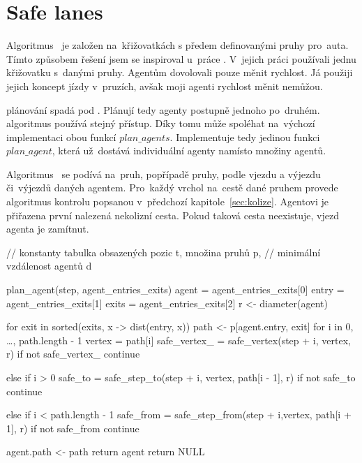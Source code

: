 \section{Safe lanes}\label{sec:safe_lanes}



Algoritmus~ je založen na~křižovatkách s předem definovanými pruhy pro~auta.
Tímto způsobem řešení jsem se inspiroval u~práce \citet{Dresner}.
V~jejich práci používali jednu křižovatku s~danými pruhy.
Agentům dovolovali pouze měnit rychlost.
Já použiji jejich koncept jízdy v~pruzích, avšak moji agenti rychlost měnit nemůžou.

\citet{Dresner} plánování spadá pod .
Plánují tedy agenty postupně jednoho po~druhém.
 algoritmus používá stejný přístup.
Díky tomu může spoléhat na~výchozí implementaci obou funkcí $plan\_agents$.
Implementuje tedy jedinou funkci $plan\_agent$, která už~dostává individuální agenty namísto množiny agentů.

Algoritmus~ se podívá na~pruh, popřípadě pruhy, podle vjezdu a výjezdu či~výjezdů daných agentem.
Pro~každý vrchol na~cestě dané pruhem provede algoritmus kontrolu popsanou v~předchozí kapitole~\ref{sec:kolize}.
Agentovi je přiřazena první nalezená nekolizní cesta.
Pokud taková cesta neexistuje, vjezd agenta je zamítnut.

\begin{code}
// konstanty tabulka obsazených pozic t, množina pruhů p,
// minimální vzdálenost agentů d

plan_agent(step, agent_entries_exits)
  agent = agent_entries_exits[0]
  entry = agent_entries_exits[1]
  exits = agent_entries_exits[2]
  r <- diameter(agent)

  for exit in sorted(exits, x -> dist(entry, x))
    path <- p[agent.entry, exit]
    for i in 0, \ldots, path.length - 1
      vertex = path[i]
      safe_vertex_ = safe_vertex(step + i, vertex, r)
      if not safe_vertex_
        continue

      else if i > 0
        safe_to = safe_step_to(step + i, vertex, path[i - 1], r)
        if not safe_to
          continue

      else if i < path.length - 1
        safe_from = safe_step_from(step + i,vertex, path[i + 1], r)
        if not safe_from
          continue

    agent.path <- path
    return agent
  return NULL
\end{code}
